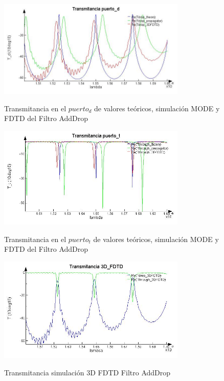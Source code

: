 \begin{figure}[H]
\caption{Transmitancia en el $puerto_d$ de valores teóricos, simulación MODE y 
FDTD del Filtro AddDrop}
\centering
\includegraphics[width=0.8\textwidth,natwidth=690,natheight=356]{figs/lum_Td.jpg}
\label{fig:lum_td_ad}
\end{figure} 

\begin{figure}[H]
\caption{Transmitancia en el $puerto_t$ de valores teóricos, simulación MODE y 
FDTD del Filtro AddDrop}
\centering
\includegraphics[width=0.8\textwidth,natwidth=659,natheight=356]{figs/lum_Tt.jpg}
\label{fig:lum_tt_ad}
\end{figure} 

\begin{figure}[H]
\caption{Transmitancia simulación 3D FDTD Filtro AddDrop}
\centering
\includegraphics[width=0.8\textwidth,natwidth=641,natheight=356]{figs/lum_T_FDTD.jpg}
\label{fig:lum_t_fdtd_ad}
\end{figure} 

